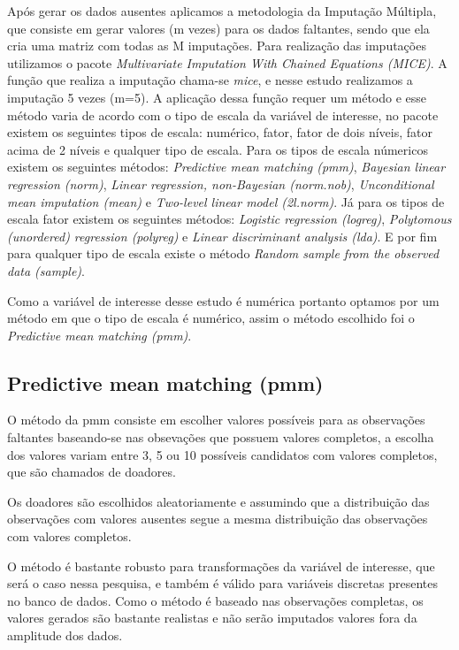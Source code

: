 \documentclass[]{article}
\begin{document}
Após gerar os dados ausentes aplicamos a metodologia da Imputação
Múltipla, que consiste em gerar valores (m vezes) para os dados
faltantes, sendo que ela cria uma matriz com todas as M imputações. Para
realização das imputações utilizamos o pacote \emph{Multivariate
Imputation With Chained Equations (MICE)}. A função que realiza a
imputação chama-se \emph{mice}, e nesse estudo realizamos a imputação 5
vezes (m=5). A aplicação dessa função requer um método e esse método
varia de acordo com o tipo de escala da variável de interesse, no pacote
existem os seguintes tipos de escala: numérico, fator, fator de dois
níveis, fator acima de 2 níveis e qualquer tipo de escala. Para os tipos
de escala númericos existem os seguintes métodos: \emph{Predictive mean
matching (pmm)}, \emph{Bayesian linear regression (norm)}, \emph{Linear
regression, non-Bayesian (norm.nob)}, \emph{Unconditional mean
imputation (mean)} e \emph{Two-level linear model (2l.norm)}. Já para os
tipos de escala fator existem os seguintes métodos: \emph{Logistic
regression (logreg)}, \emph{Polytomous (unordered) regression (polyreg)}
e \emph{Linear discriminant analysis (lda)}. E por fim para qualquer
tipo de escala existe o método \emph{Random sample from the observed
data (sample)}.

Como a variável de interesse desse estudo é numérica portanto optamos
por um método em que o tipo de escala é numérico, assim o método
escolhido foi o \emph{Predictive mean matching (pmm)}.

\subsection{Predictive mean matching
(pmm)}\label{predictive-mean-matching-pmm}

O método da pmm consiste em escolher valores possíveis para as
observações faltantes baseando-se nas obsevações que possuem valores
completos, a escolha dos valores variam entre 3, 5 ou 10 possíveis
candidatos com valores completos, que são chamados de doadores.

Os doadores são escolhidos aleatoriamente e assumindo que a distribuição
das observações com valores ausentes segue a mesma distribuição das
observações com valores completos.

O método é bastante robusto para transformações da variável de
interesse, que será o caso nessa pesquisa, e também é válido para
variáveis discretas presentes no banco de dados. Como o método é baseado
nas observações completas, os valores gerados são bastante realistas e
não serão imputados valores fora da amplitude dos dados.
\end{document}
